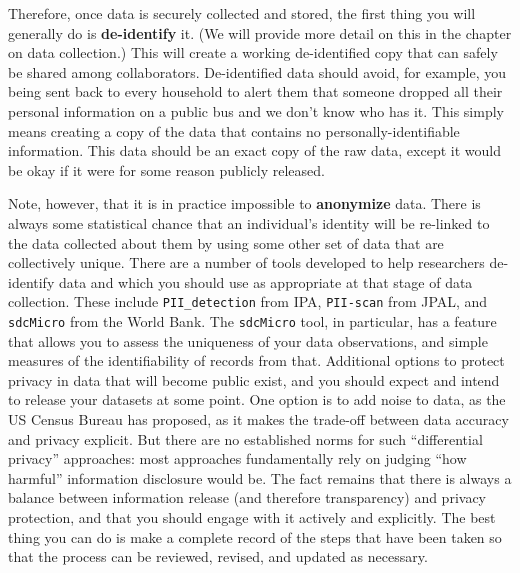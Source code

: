Therefore, once data is securely collected and stored,
the first thing you will generally do is \textbf{de-identify} it.
(We will provide more detail on this in the chapter on data collection.)
This will create a working de-identified copy
that can safely be shared among collaborators.
De-identified data should avoid, for example,
you being sent back to every household
to alert them that someone dropped all their personal information
on a public bus and we don't know who has it.
This simply means creating a copy of the data
that contains no personally-identifiable information.
This data should be an exact copy of the raw data,
except it would be okay if it were for some reason publicly released.\cite{matthews2011data}

Note, however, that it is in practice impossible to \textbf{anonymize} data.
There is always some statistical chance that an individual's identity
will be re-linked to the data collected about them
by using some other set of data that are collectively unique.
There are a number of tools developed to help researchers de-identify data
and which you should use as appropriate at that stage of data collection.
These include \texttt{PII\_detection} from IPA,
\texttt{PII-scan} from JPAL,
and \texttt{sdcMicro} from the World Bank.
The \texttt{sdcMicro} tool, in particular, has a feature
that allows you to assess the uniqueness of your data observations,
and simple measures of the identifiability of records from that.
Additional options to protect privacy in data that will become public exist,
and you should expect and intend to release your datasets at some point.
One option is to add noise to data, as the US Census Bureau has proposed,\cite{abowd2018us}
as it makes the trade-off between data accuracy and privacy explicit.
But there are no established norms for such ``differential privacy'' approaches:
most approaches fundamentally rely on judging ``how harmful'' information disclosure would be.
The fact remains that there is always a balance between information release (and therefore transparency)
and privacy protection, and that you should engage with it actively and explicitly.
The best thing you can do is make a complete record of the steps that have been taken
so that the process can be reviewed, revised, and updated as necessary.
